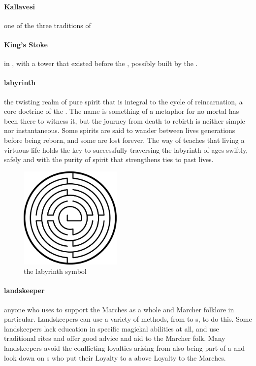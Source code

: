 \paragraph{Kallavesi} one of the three traditions of 
\paragraph{King's Stoke}  in , with a tower that existed before the , possibly built by the .
\paragraph{labyrinth}the twisting realm of pure spirit that is integral to the cycle of reincarnation, a core doctrine of the . The name is something of a metaphor for no mortal has been there to witness it, but the journey from death to rebirth is neither simple nor instantaneous. Some spirits are said to wander between lives generations before being reborn, and some are lost forever. The way of  teaches that living a virtuous life holds the key to successfully traversing the labyrinth of ages swiftly, safely and with the purity of spirit that strengthens ties to past lives.\begin{figure} \centering \includegraphics[width=5cm]{encyclopedia/Labyrinth} \caption{the  labyrinth symbol}\end{figure}
\paragraph{landskeeper} anyone who uses  to support the Marches as a whole and Marcher folklore in particular. Landskeepers can use a variety of methods, from  to s, to do this. Some landskeepers lack education in specific magickal abilities at all, and use traditional rites and offer good advice and aid to the Marcher folk. Many landskeepers avoid the conflicting loyalties arising from also being part of a  and look down on s who put their Loyalty to a  above Loyalty to the Marches.
